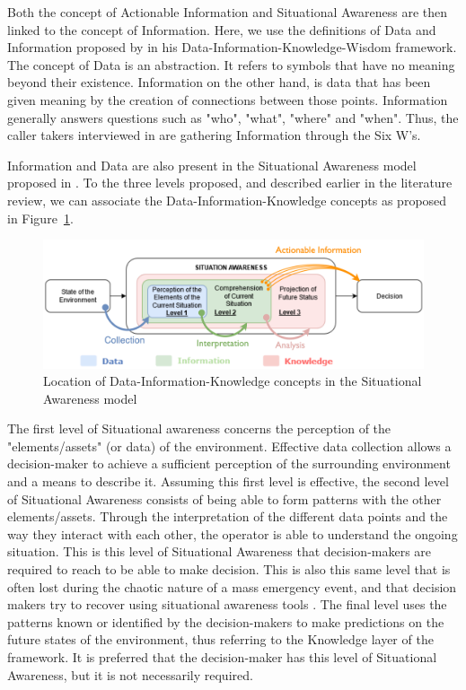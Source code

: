 Both the concept of Actionable Information and Situational Awareness are then linked to the concept of Information.
Here, we use the definitions of Data and Information proposed by \textcite{ackoffDataWisdom1989} in his Data-Information-Knowledge-Wisdom framework.
The concept of Data is an abstraction.
It refers to symbols that have no meaning beyond their existence.
Information on the other hand, is data that has been given meaning by the creation of connections between those points.
Information generally answers questions such as "who", "what", "where" and "when".
Thus, the caller takers interviewed in \textcite{kropczynskiIdentifyingActionableInformation2018} are gathering Information through the Six W's.

Information and Data are also present in the Situational Awareness model proposed in \textcite{endsleyTheorySituationAwareness1995}.
To the three levels proposed, and described earlier in the literature review, we can associate the Data-Information-Knowledge concepts as proposed in Figure~\ref{information:SA-DIK}.

\begin{figure}[htb]
    \centering
    \includegraphics[width=\textwidth]{figures/chap-3/Fig2-2.pdf}
    \caption{Location of Data-Information-Knowledge concepts in the Situational Awareness model}
    \label{information:SA-DIK}
\end{figure}

The first level of Situational awareness concerns the perception of the "elements/assets" (or data) of the environment.
Effective data collection allows a decision-maker to achieve a sufficient perception of the surrounding environment and a means to describe it.
Assuming this first level is effective, the second level of Situational Awareness consists of being able to form patterns with the other elements/assets.
Through the interpretation of the different data points and the way they interact with each other, the operator is able to understand the ongoing situation.
This is this level of Situational Awareness that decision-makers are required to reach to be able to make decision.
This is also this same level that is often lost during the chaotic nature of a mass emergency event, and that decision makers try to recover using situational awareness tools \parencite{endsleyTheorySituationAwareness1995}.
The final level uses the patterns known or identified by the decision-makers to make predictions on the future states of the environment, thus referring to the Knowledge layer of the framework.
It is preferred that the decision-maker has this level of Situational Awareness, but it is not necessarily required.

